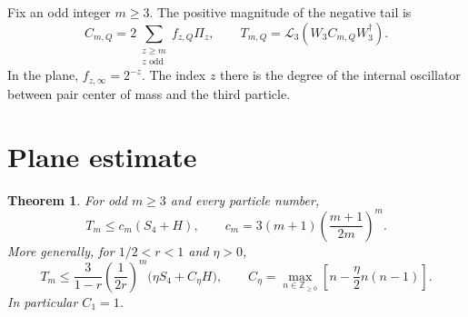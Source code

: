 \documentclass[11pt]{article}
\newtheorem{theorem}{Theorem}
\begin{document}
Fix an odd integer $m\ge3$. The positive magnitude of the negative tail is
\begin{equation}\label{eq:taildef}
 C_{m,Q}=2\sum_{\substack{z\ge m\\z\text{ odd}}}f_{z,Q}\Pi_z,
 \qquad T_{m,Q}=\mathcal L_3(W_3 C_{m,Q}W_3^\dagger).
\end{equation}
In the plane, $f_{z,\infty}=2^{-z}$. The index $z$ there is the degree of
the internal oscillator between pair center of mass and the third particle.

\section{Plane estimate}
\begin{theorem}\label{thm:plane}
For odd $m\ge3$ and every particle number,
\begin{equation}\label{eq:planebound}
 T_m\le c_m(S_4+H),\qquad
 c_m=3(m+1)\left(\frac{m+1}{2m}\right)^m.
\end{equation}
More generally, for $1/2<r<1$ and $\eta>0$,
\begin{equation}
 T_m\le \frac3{1-r}\left(\frac1{2r}\right)^m
 \big(\eta S_4+C_\eta H\big),\qquad
 C_\eta=\max_{n\in\mathbb Z_{\ge0}}
 \left[n-\frac\eta2n(n-1)\right].
\end{equation}
In particular $C_1=1$.
\end{theorem}
\end{document}
